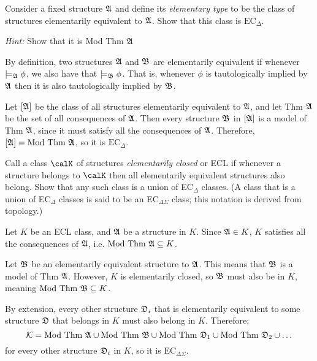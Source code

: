 \begin{problem}[26]
  \begin{enumalph}
    \item Consider a fixed structure $\mathfrak{A}$ and define its \emph{elementary type}
      to be the class of structures elementarily equivalent to $\mathfrak{A}$.
      Show that this class is $\text{EC}_{\Delta}$.

      \step
      \emph{Hint:} Show that it is Mod Thm $\mathfrak{A}$
      \begin{Answer}
        By definition, two structures $\mathfrak{A}$ and $\mathfrak{B}$ are elementarily equivalent
        if whenever $\models_{\mathfrak{A}} \phi$, we also have that $\models_{\mathfrak{B}} \phi$.
        That is, whenever $\phi$ is tautologically implied by $\mathfrak{A}$
        then it is also tautologically implied by $\mathfrak{B}$.

        \step
        Let $[\mathfrak{A}]$ be the class of all structures elementarily
        equivalent to $\mathfrak{A}$,
        and let Thm $\mathfrak{A}$ be the set of all consequences of $\mathfrak{A}$.
        Then every structure $\mathfrak{B}$ in $[\mathfrak{A}]$ is a model of Thm $\mathfrak{A}$,
        since it must satisfy all the consequences of $\mathfrak{A}$.
        Therefore, $[\mathfrak{A}] = \text{Mod Thm } \mathfrak{A}$,
        so it is $\text{EC}_{\Delta}$.
      \end{Answer}

    \item Call a class $\calK$ of structures \emph{elementarily closed} or ECL
      if whenever a structure belongs to $\calK$ then all elementarily equivalent
      structures also belong.
      Show that any such class is a union of EC$_\Delta$ classes.
      (A class that is a union of EC$_\Delta$ classes is said to be an EC$_{\Delta \Sigma}$ class;
      this notation is derived from topology.)
      \begin{Answer}
        Let $K$ be an ECL class,
        and $\mathfrak{A}$ be a structure in $K$.
        Since $\mathfrak{A} \in K$, $K$ satisfies all the consequences of $\mathfrak{A}$,
        i.e. $\text{Mod Thm } \mathfrak{A} \subseteq K$.

        \step
        Let $\mathfrak{B}$ be an elementarily equivalent structure to $\mathfrak{A}$.
        This means that $\mathfrak{B}$ is a model of Thm $\mathfrak{A}$.
        However, $K$ is elementarily closed, so
        $\mathfrak{B}$ must also be in $K$,
        meaning $\text{Mod Thm }\mathfrak{B} \subseteq K$.
        
        \step
        By extension, every other structure $\mathfrak{D}_i$ that is elementarily
        equivalent to some structure $\mathfrak{D}$ that belongs in $K$
        must also belong in $K$.
        Therefore;
        \[ \mathcal{K} = \text{Mod Thm }\mathfrak{A} \cup \text{Mod Thm }\mathfrak{B} \cup \text{Mod Thm }\mathfrak{D}_1 \cup \text{Mod Thm }\mathfrak{D}_2 \cup \ldots \]
        for every other structure $\mathfrak{D}_i$ in $K$,
        so it is EC$_{\Delta \Sigma}$.
      \end{Answer}


\end{enumalph}
\end{problem}
